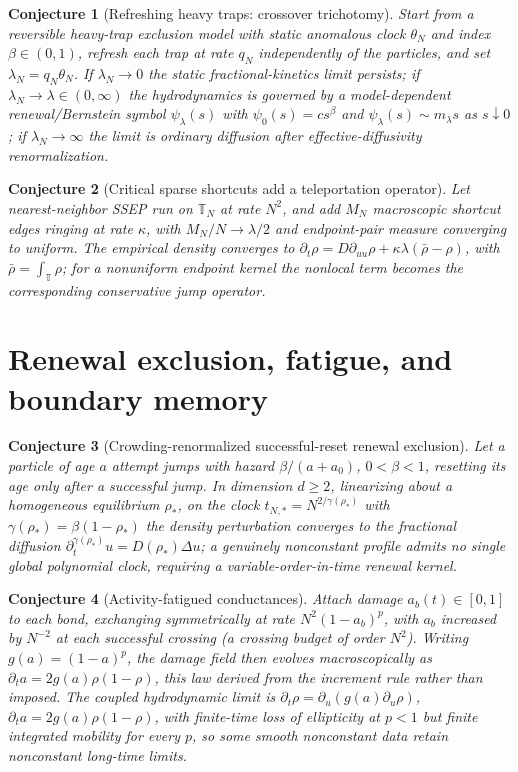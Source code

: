 \documentclass[11pt]{article}
\newtheorem{conjecture}{Conjecture}
\theoremstyle{definition}
\begin{document}
\begin{conjecture}[Refreshing heavy traps: crossover trichotomy]\label{an2}
Start from a reversible heavy-trap exclusion model with static anomalous clock $\theta_N$ and index $\beta\in(0,1)$, refresh each trap at rate $q_N$ independently of the particles, and set $\lambda_N=q_N\theta_N$.  If $\lambda_N\to0$ the static fractional-kinetics limit persists; if $\lambda_N\to\lambda\in(0,\infty)$ the hydrodynamics is governed by a model-dependent renewal/Bernstein symbol $\psi_\lambda(s)$ with $\psi_0(s)=cs^\beta$ and $\psi_\lambda(s)\sim m_\lambda s$ as $s\downarrow0$; if $\lambda_N\to\infty$ the limit is ordinary diffusion after effective-diffusivity renormalization.
\end{conjecture}

\begin{conjecture}[Critical sparse shortcuts add a teleportation operator]\label{an3}
Let nearest-neighbor SSEP run on $\mathbb T_N$ at rate $N^2$, and add $M_N$ macroscopic shortcut edges ringing at rate $\kappa$, with $M_N/N\to\lambda/2$ and endpoint-pair measure converging to uniform.  The empirical density converges to $\partial_t\rho=D\partial_{uu}\rho+\kappa\lambda(\bar\rho-\rho)$, with $\bar\rho=\int_{\mathbb T}\rho$; for a nonuniform endpoint kernel the nonlocal term becomes the corresponding conservative jump operator.
\end{conjecture}

\section{Renewal exclusion, fatigue, and boundary memory}

\begin{conjecture}[Crowding-renormalized successful-reset renewal exclusion]\label{an4}
Let a particle of age $a$ attempt jumps with hazard $\beta/(a+a_0)$, $0<\beta<1$, resetting its age only after a successful jump.  In dimension $d\ge2$, linearizing about a homogeneous equilibrium $\rho_*$, on the clock $t_{N,*}=N^{2/\gamma(\rho_*)}$ with $\gamma(\rho_*)=\beta(1-\rho_*)$ the density perturbation converges to the fractional diffusion $\partial_t^{\gamma(\rho_*)}u=D(\rho_*)\Delta u$; a genuinely nonconstant profile admits no single global polynomial clock, requiring a variable-order-in-time renewal kernel.
\end{conjecture}

\begin{conjecture}[Activity-fatigued conductances]\label{an5}
Attach damage $a_b(t)\in[0,1]$ to each bond, exchanging symmetrically at rate $N^2(1-a_b)^p$, with $a_b$ increased by $N^{-2}$ at each successful crossing (a crossing budget of order $N^2$).  Writing $g(a)=(1-a)^p$, the damage field then evolves macroscopically as $\partial_ta=2g(a)\rho(1-\rho)$, this law derived from the increment rule rather than imposed.  The coupled hydrodynamic limit is $\partial_t\rho=\partial_u(g(a)\partial_u\rho)$, $\partial_ta=2g(a)\rho(1-\rho)$, with finite-time loss of ellipticity at $p<1$ but finite integrated mobility for every $p$, so some smooth nonconstant data retain nonconstant long-time limits.
\end{conjecture}
\end{document}
